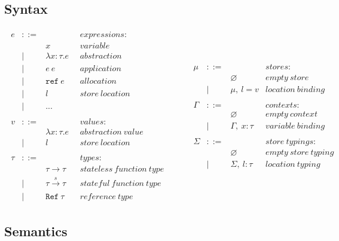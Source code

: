 \documentclass{llncs}
\newcommand{\reftt}{\mathtt{ref}~}
\newcommand{\Reftt}{\mathtt{Ref}~}
\begin{document}
\subsection{Syntax}

\[
\begin{array}{lll}
\begin{array}{lllr}
e & ::= & & expressions \colon\\
& & x & variable\\
& | & \lambda x : \tau . e & abstraction\\
& | & e~e & application\\
& | & \reftt e & allocation\\
& | & l & store~location\\
& | & ...\\
&&&\\
v & ::= & & values \colon\\
& & \lambda x : \tau . e & abstraction~value\\
& | & l & store~location\\
&&&\\
\tau & ::= & & types \colon\\
& & \tau \rightarrow \tau & stateless~function~type\\
& | & \tau \xrightarrow{s} \tau~~~~& stateful~function~type\\
& | & \Reftt \tau & reference~type
\end{array}
& ~~~~~
&
\begin{array}{lllr}
\mu & ::= & & stores \colon\\
& & \varnothing & empty~store\\
& | & \mu,~l = v & location~binding\\
&&&\\
\Gamma & ::= & & contexts \colon\\
& & \varnothing & empty~context\\
& | & \Gamma,~x : \tau & variable~binding\\
&&&\\
\Sigma & ::= & & store~typings \colon\\
& & \varnothing & empty~store~typing\\
& | & \Sigma,~l : \tau & location~typing
\end{array}
\end{array}
\]


\subsection{Semantics}
\end{document}
